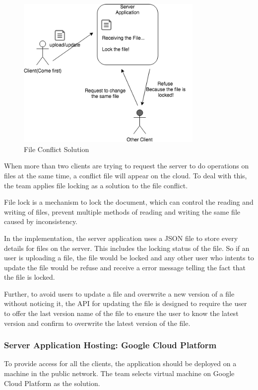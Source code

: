 \documentclass{article}
\begin{document}
\begin{figure}[H]
\begin{center}
\includegraphics[width=9cm]{Backend_Diagram_FileLock.png}
\end{center}
\caption{File Conflict Solution}\label{ex412}
\end{figure}

When more than two clients are trying to request the server to do operations on files at the same time, a conflict file will appear on the cloud. To deal with this, the team applies file locking as a solution to the file conflict.

File lock is a mechanism to lock the document, which can control the reading and writing of files, prevent multiple methods of reading and writing the same file caused by inconsistency.

In the implementation, the server application uses a JSON file to store every details for files on the server. This includes the locking status of the file. So if an user is uploading a file, the file would be locked and any other user who intents to update the file would be refuse and receive a error message telling the fact that the file is locked.

Further, to avoid users to update a file and overwrite a new version of a file without noticing it, the API for updating the file is designed to require the user to offer the last version name of the file to ensure the user to know the latest version and confirm to overwrite the latest version of the file.

\subsubsection{Server Application Hosting: Google Cloud Platform}

To provide access for all the clients, the application should be deployed on a machine in the public network. The team selects virtual machine on Google Cloud Platform as the solution.
\end{document}
